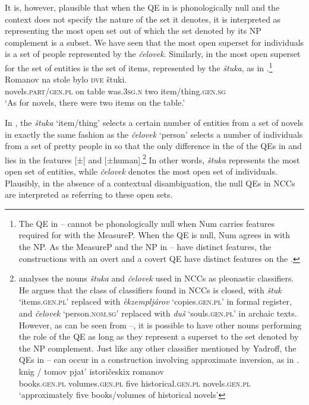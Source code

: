 \documentclass[output=paper,modfonts,newtxmath,hidelinks]{langscibook}
\begin{document}
\noindent It is, however, plausible that when the QE in  is phonologically null and the context does not specify the nature of the set it denotes, it is interpreted as representing the most open set out of which the set denoted by its NP\textsubscript{} complement is a subset. We have seen that the most open superset for individuals is a set of people represented by the  \textit{čelovek}. Similarly, in  the most open superset for the set of  entities is the set of items, represented by the  \textit{štuka}, as in .\footnote{\label{18:fn22}The QE in -- cannot be phonologically null when Num carries   features required for  with the  MeasureP. When the QE is null, Num agrees in  with the  NP. As the MeasureP and the NP in -- have distinct  features, the constructions with an overt and a covert QE have distinct  features on the .
} 
\ea \label{18:ex33}
\gll Romanov  na   stole  bylo  \textsc{dve}  štuki.\\
     novels.\textsc{part/gen.pl} on table  was.\textsc{3sg.n}  two  item/thing.\textsc{gen.sg}\\
\glt  `As for novels, there were two items on the table.'
\z

\largerpage
\noindent In , the  \textit{štuka} ‘item/thing’ selects a certain number of entities from a set of novels in exactly the same fashion as the  \textit{čelovek} ‘person’ selects a number of individuals from a set of pretty people in  so that the only difference in the  of the QEs in  and  lies in the features [$\pm$] and [$\pm$human].\footnote{\label{18:fn23}\citet{Yadroff1999} analyses the nouns \textit{štuka} and \textit{čelovek} used in NCCs as pleonastic  classifiers. He argues that the class of classifiers found in NCCs is closed, with \textit{štuk} ‘items\textsc{.gen.pl’} replaced with \textit{èkzempljárov} ‘copies\textsc{.gen.pl’} in formal register, and \textit{čelovek} ‘person.\textsc{nom.sg’} replaced with \textit{duš} ‘souls\textsc{.gen.pl’} in archaic texts. However, as can be seen from --, it is possible to have other nouns performing the role of the QE as long as they represent a superset to the set denoted by the NP complement. Just like any other classifier mentioned by Yadroff, the QEs in -- can occur in a construction involving approximate inversion, as in .  
\ea \label{18:fn23i}
\gll knig / tomov    pjat’   istoričeskix   romanov  \\
 	 books.\textsc{gen.pl} {} volumes.\textsc{gen.pl} five  historical.\textsc{gen.pl}   novels.\textsc{gen.pl}  \\
\glt `approximately five books/volumes of historical novels'
\zlast} 
In other words, \textit{štuka} represents the most open set of entities, while \textit{čelovek} denotes the most open set of individuals. Plausibly, in the absence of a contextual disambiguation, the null QEs in NCCs are interpreted as referring to these open sets.
\end{document}
